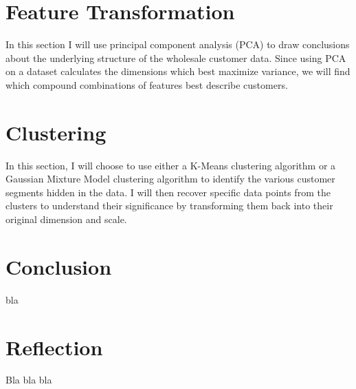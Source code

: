 \documentclass[a4paper]{article}
\begin{document}

\section{Feature Transformation}
\label{sec:feature_transformation}
In this section I will use principal component analysis (PCA) to draw conclusions about the underlying structure of the wholesale customer data. Since using PCA on a dataset calculates the dimensions which best maximize variance, we will find which compound combinations of features best describe customers.



\section{Clustering}
\label{sec:clustering}
In this section, I will choose to use either a K-Means clustering algorithm or a Gaussian Mixture Model clustering algorithm to identify the various customer segments hidden in the data. I will then recover specific data points from the clusters to understand their significance by transforming them back into their original dimension and scale.



\section{Conclusion}
\label{sec:conclusion}
bla


\section{Reflection}
\label{sec:reflection}
Bla bla bla






\end{document}
